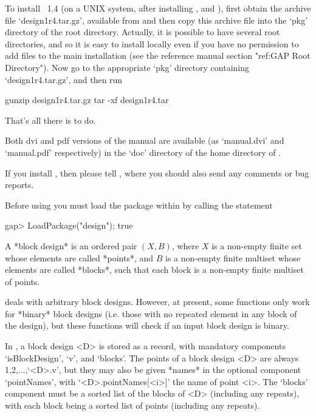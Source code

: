 To install {\DESIGN}~1.4 (on a UNIX system, after
installing {\GAP}, {\GRAPE} and {\GAPDoc}), first obtain
the {\DESIGN} archive file `design1r4.tar.gz', available from
 and then copy
this archive file into the `pkg' directory of the {\GAP} root
directory. Actually, it is possible to have several {\GAP} root
directories, and so it is easy to install {\DESIGN} locally even if you
have no permission to add files to the main {\GAP} installation (see the
{\GAP} reference manual section "ref:GAP Root Directory").  Now go to the
appropriate `pkg' directory containing `design1r4.tar.gz', and then run

\begintt
gunzip design1r4.tar.gz
tar -xf design1r4.tar
\endtt

That's all there is to do.

Both dvi and pdf versions of the {\DESIGN} manual are available
(as `manual.dvi' and `manual.pdf' respectively) in the `doc' directory
of the home directory of {\DESIGN}.

If you install {\DESIGN}, then please tell
, where you should also send any comments
or bug reports.


Before using {\DESIGN} you must load the package within {\GAP} by calling 
the statement

\begintt
gap> LoadPackage("design");
true
\endtt


A *block design* is an ordered pair $(X,B)$, where
$X$ is a non-empty finite set whose elements are called *points*, and
$B$ is a non-empty finite multiset whose elements are called *blocks*,
such that each block is a non-empty finite multiset of points.

{\DESIGN} deals with arbitrary block designs. However, at present, some
{\DESIGN} functions only work for *binary* block designs (i.e. those with no repeated element in any block of
the design), but these functions will check if an input block design
is binary.

In {\DESIGN}, a block design <D> is stored as a record, with mandatory
components `isBlockDesign', `v', and `blocks'.  The points of a block
design <D> are always 1,2,...,`<D>.v', but they may also be given *names*
in the optional component `pointNames', with `<D>.pointNames[<i>]'
the name of point <i>.  The `blocks' component must be a sorted list
of the blocks of <D> (including any repeats), with each block being a
sorted list of points (including any repeats). 


